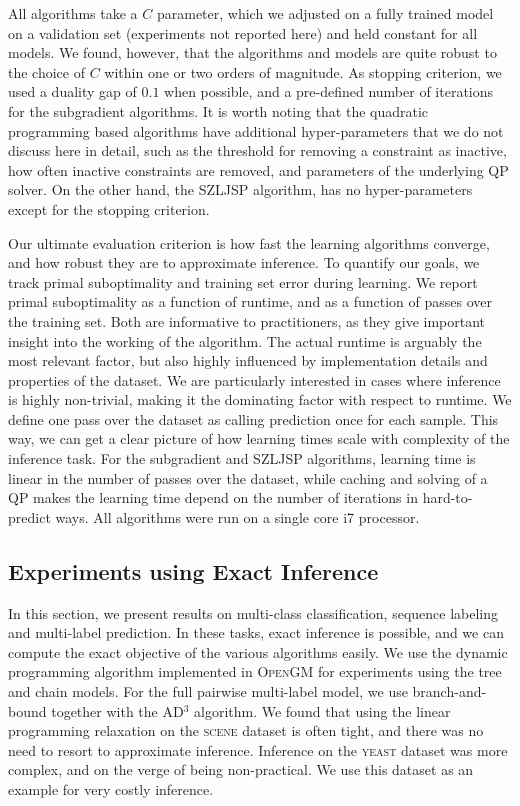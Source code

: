 All algorithms take a $C$ parameter, which we adjusted on a fully trained model
on a validation set (experiments not reported here) and held constant for all
models.  We found, however, that the algorithms and models are quite robust to
the choice of $C$ within one or two orders of magnitude.
As stopping criterion, we used a duality gap of $0.1$ when possible, and a
pre-defined number of iterations for the subgradient algorithms. It is worth
noting that the quadratic programming based algorithms have additional
hyper-parameters that we do not discuss here in detail, such as the threshold
for removing a constraint as inactive, how often inactive constraints are
removed, and parameters of the underlying QP solver. On the other hand, the
SZLJSP algorithm, has no hyper-parameters except for the stopping criterion.

Our ultimate evaluation criterion is how fast the learning algorithms converge,
and how robust they are to approximate inference.  To quantify our goals, we
track primal suboptimality and training set error during learning.
We report primal suboptimality as a function of runtime, and as a function of passes
over the training set.  Both are informative to practitioners, as they give
important insight into the working of the algorithm.  The actual runtime is
arguably the most relevant factor, but also highly influenced by
implementation details and properties of the dataset. We are particularly
interested in cases where inference is highly non-trivial, making it the
dominating factor with respect to runtime.
We define one pass over the dataset as calling prediction once for each sample.
This way, we can get a clear picture of how learning times scale with complexity of the
inference task. For the subgradient and SZLJSP algorithms, learning time is linear
in the number of passes over the dataset, while caching and solving of a QP makes
the learning time depend on the number of iterations in hard-to-predict ways.
All algorithms were run on a single core i7 processor.

\subsection{Experiments using Exact Inference}
In this section, we present results on multi-class classification, sequence
labeling and multi-label prediction. In these tasks, exact inference is
possible, and we can compute the exact objective of the various algorithms
easily. We use the dynamic programming algorithm implemented in \textsc{OpenGM}
for experiments using the tree and chain models.
For the full pairwise multi-label model, we use branch-and-bound together with
the AD$^3$ algorithm.
We found that using the linear programming relaxation on the \textsc{scene} dataset is
often tight, and there was no need to resort to approximate inference. Inference
on the \textsc{yeast} dataset was more complex, and on the verge of being non-practical.
We use this dataset as an example for very costly inference.

